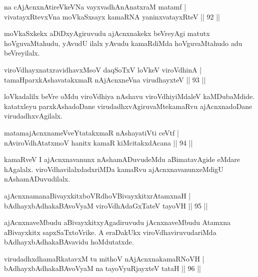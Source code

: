 
\begin{shl}
na cAjAcnxnAtireVkeVNa vayxvadhAnAnatxraM matamf |\\
vivatayxRtevxVna moVkaSxsayx kamaRNA yaninxvatayxRteV \hfill || 92 ||
\end{shl}

\begin{artha}
moVkaSxkekx aDiDxyAgiruvudu ajAcnxnakekx beVreyAgi matutx hoVguvaMtahudu, yAvudU ilalx yAvudu kamaRdiMda hoVguvaMtahudo adu beVreyilalx.
\end{artha}

\begin{shl}
viroVdhayxnatxravidhavxMsoV daqSoTxV loVkeV viroVdhinA |\\
tamaHparxkAshavatakxmaR nAjAcnxneVna virudhayxteV \hfill || 93 ||
\end{shl}

\begin{artha}
loVkadalilx beVre oMdu viroVdhiya nAshavu viroVdhiyiMdaleV kaMDubaMdide. katatxleyu parxkAshadoDane virudadhxvAgiruvaMte\break kamaRvu ajAcnxnadoDane virudadhxvAgilalx.
\end{artha}

\begin{shl}
matamajAcnxnameVveYtatakxmaR nAshayatiVti ceVtf |\\
nAviroVdhAtatxmoV hanitx kamaR kiMcitakxdAcana \hfill || 94 ||
\end{shl}

\begin{artha}
kamaRveV I ajAcnxnavanunx nAshamADuvudeMdu aBimatavAgide eMdare hAgalalx. viroVdhavilalxdadxriMDa kamaRvu ajAcnxnavanunx\break eMdigU nAshamADuvudilalx.
\end{artha}

\begin{shl}
ajAcnxnamanaBivayxkitxboVRdhoV\s BivayxkitxrAtamxnaH |\\
bAdhayxbAdhakaBAvoV\s yaM viroVdhAdaGxTateV tayoVH \hfill || 95 ||
\end{shl}

\begin{artha}
ajAcnxnaveMbudu aBivayxkitxyAgadiruvudu jAcnxnaveMbudu Atamxna aBivayxkitx sapxSaTxtoVrike. A eraDakUkx viroVdhaviruvudariMda bAdhayxbAdhakaBAvavidu hoMdutatxde.
\end{artha}

\begin{shl}
virudadhxdhamaRkatavxM tu mithoV nAjAcnxnakamaRNoVH |\\
bAdhayxbAdhakaBAvoV\s yaM na tayoVyuRjayxteV tataH \hfill || 96 ||
\end{shl}

